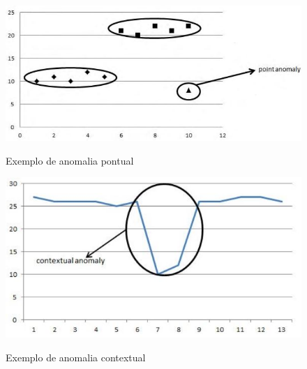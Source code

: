 \begin{figure}[H]
\caption{\small Exemplo de anomalia pontual}
\centering
\includegraphics[scale=0.5]{figs/anomalia_pontual.JPG}
\label{f.anomalia_pontual}
\end{figure}

\begin{figure}[H]
\caption{\small Exemplo de anomalia contextual}
\centering
\includegraphics[scale=0.5]{figs/anomalia_contextual.JPG}
\label{f.contextual}
\end{figure}


